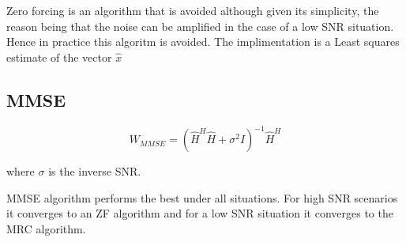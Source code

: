 Zero forcing is an algorithm that is avoided although given its simplicity, the reason being that the noise can be amplified in the case of a low SNR situation. Hence in practice this algoritm is avoided. The implimentation is a Least squares estimate of the vector $\hat{x}$

\subsection{MMSE}\label{ssec:MMSE}

\begin{equation}
    W_{MMSE} = (\hat{H}^H\hat{H}+\sigma^{2}I)^{-1}\hat{H}^H
\end{equation}

where $\sigma$ is the inverse SNR.

MMSE algorithm performs the best under all situations. For high SNR scenarios it converges to an ZF algorithm and for a low SNR situation it converges to the MRC algorithm.
